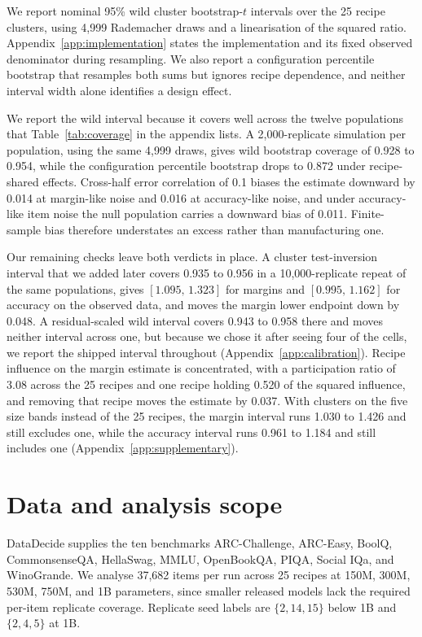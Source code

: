 \documentclass{article}
\newcommand{\ci}[2]{\ensuremath{[#1,\,#2]}}
\begin{document}
We report nominal 95\% wild cluster bootstrap-$t$ intervals over the 25 recipe clusters, using 4,999 Rademacher draws and a linearisation of the squared ratio. Appendix~\ref{app:implementation} states the implementation and its fixed observed denominator during resampling. We also report a configuration percentile bootstrap that resamples both sums but ignores recipe dependence, and neither interval width alone identifies a design effect.

We report the wild interval because it covers well across the twelve populations that Table~\ref{tab:coverage} in the appendix lists. A 2,000-replicate simulation per population, using the same 4,999 draws, gives wild bootstrap coverage of 0.928 to 0.954, while the configuration percentile bootstrap drops to 0.872 under recipe-shared effects. Cross-half error correlation of 0.1 biases the estimate downward by 0.014 at margin-like noise and 0.016 at accuracy-like noise, and under accuracy-like item noise the null population carries a downward bias of 0.011. Finite-sample bias therefore understates an excess rather than manufacturing one.

Our remaining checks leave both verdicts in place. A cluster test-inversion interval that we added later covers 0.935 to 0.956 in a 10,000-replicate repeat of the same populations, gives \ci{1.095}{1.323} for margins and \ci{0.995}{1.162} for accuracy on the observed data, and moves the margin lower endpoint down by 0.048. A residual-scaled wild interval covers 0.943 to 0.958 there and moves neither interval across one, but because we chose it after seeing four of the cells, we report the shipped interval throughout (Appendix~\ref{app:calibration}). Recipe influence on the margin estimate is concentrated, with a participation ratio of 3.08 across the 25 recipes and one recipe holding 0.520 of the squared influence, and removing that recipe moves the estimate by 0.037. With clusters on the five size bands instead of the 25 recipes, the margin interval runs 1.030 to 1.426 and still excludes one, while the accuracy interval runs 0.961 to 1.184 and still includes one (Appendix~\ref{app:supplementary}).

\section{Data and analysis scope}
DataDecide supplies the ten benchmarks ARC-Challenge, ARC-Easy, BoolQ, CommonsenseQA, HellaSwag, MMLU, OpenBookQA, PIQA, Social IQa, and WinoGrande. We analyse 37,682 items per run across 25 recipes at 150M, 300M, 530M, 750M, and 1B parameters, since smaller released models lack the required per-item replicate coverage. Replicate seed labels are $\{2,14,15\}$ below 1B and $\{2,4,5\}$ at 1B.
\end{document}
